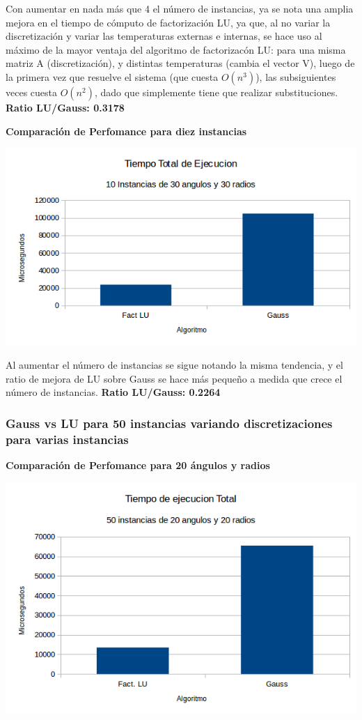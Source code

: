Con aumentar en nada m\'as que 4 el n\'umero de instancias, ya se nota una amplia mejora en el tiempo de c\'omputo de factorizaci\'on LU, ya que, al no variar la discretizaci\'on y variar las temperaturas externas e internas, se hace uso al m\'aximo de la mayor ventaja del algoritmo de factorizac\'on LU: para una misma matriz A (discretizaci\'on), y distintas temperaturas (cambia el vector V), luego de la primera vez que resuelve el sistema (que cuesta $O(n^3)$), las subsiguientes veces cuesta $O(n^2)$, dado que simplemente tiene que realizar substituciones. \textbf{Ratio LU/Gauss: 0.3178}

 \textbf{Comparaci\'on de Perfomance para diez instancias}\\
\begin{center}
\includegraphics[scale=0.7]{experimentos2a_2b/2bDiezInstancias.png}
\end{center}

Al aumentar el n\'umero de instancias se sigue notando la misma tendencia, y el ratio de mejora de LU sobre Gauss se hace m\'as pequeño a medida que crece el n\'umero de instancias. \textbf{Ratio LU/Gauss: 0.2264}

\subsubsection{Gauss vs LU para 50 instancias variando discretizaciones para varias instancias}

  	\textbf{Comparaci\'on de Perfomance para 20 \'angulos y radios }\\
\begin{center}
\includegraphics[scale=0.7]{experimentos2a_2b/2b2020.png}
\end{center}

